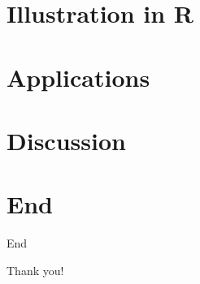 \documentclass{beamer}
\begin{document}
\section{Illustration in R}
\transition
%

\section{Applications}
\transition
%

\section{Discussion}
\transition
%

\section*{End}

{
\framenonumber
\begin{frame}[noframenumbering]{End}
\begin{center}
\Huge Thank you!
\end{center}
\end{frame}
}
\end{document}
